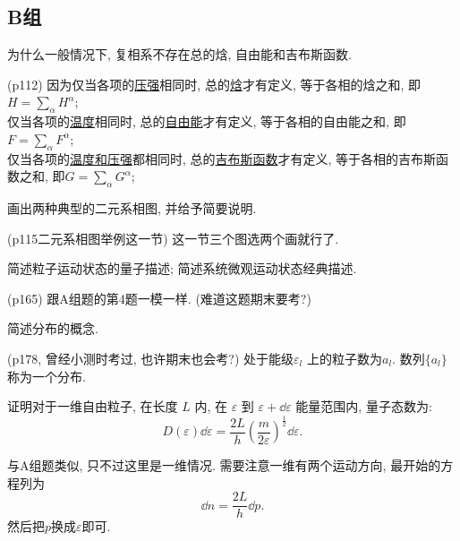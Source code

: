 \subsection{B组}
\begin{questions}
  \question 为什么一般情况下, 复相系不存在总的焓, 自由能和吉布斯函数.
\begin{solution}
  (p112) 因为仅当各项的\uline{压强}相同时, 总的\uline{焓}才有定义, 等于各相的焓之和, 即$H = \sum_\alpha H^\alpha$;\\
  仅当各项的\uline{温度}相同时, 总的\uline{自由能}才有定义, 等于各相的自由能之和, 即$F = \sum_\alpha F^\alpha$; \\
  仅当各项的\uline{温度和压强}都相同时, 总的\uline{吉布斯函数}才有定义, 等于各相的吉布斯函数之和, 即$G = \sum_\alpha G^\alpha$;
\end{solution}
  \question 画出两种典型的二元系相图, 并给予简要说明.
\begin{solution}
  (p115二元系相图举例这一节) 这一节三个图选两个画就行了.
\end{solution}
  \question 简述粒子运动状态的量子描述; 简述系统微观运动状态经典描述.
\begin{solution}
  (p165) 跟A组题的第4题一模一样. (难道这题期末要考?)
\end{solution}
  \question 简述分布的概念.
\begin{solution}
  (p178, 曾经小测时考过, 也许期末也会考?) 处于能级$\varepsilon_l$ 上的粒子数为$a_l$. 数列$\{a_l\}$称为一个分布.
\end{solution}
  \question 证明对于一维自由粒子, 在长度 $L$ 内, 在 $\varepsilon$ 到 $\varepsilon+\dd \varepsilon$ 能量范围内, 量子态数为:
  \begin{equation}
D(\varepsilon)\dd \varepsilon = \frac{2L}{h} \left( \frac{m}{2 \varepsilon} \right)^{\frac{1}{2}}\dd \varepsilon.
  \end{equation}
\begin{solution}
  与A组题类似, 只不过这里是一维情况. 需要注意一维有两个运动方向, 最开始的方程列为
  \begin{equation}
    \dd n = \frac{2L}{h}\dd p.
  \end{equation}
  然后把$p$换成$\varepsilon$即可.
\end{solution}
\end{questions}

